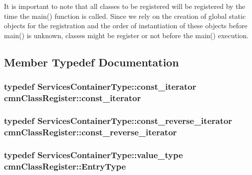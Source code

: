 It is important to note that all classes to be registered will be registered by the time the {\ttfamily main()} function is called. Since we rely on the creation of global static objects for the registration and the order of instantiation of these objects before {\ttfamily main()} is unknown, classes might be register or not before the {\ttfamily main()} execution. 

\subsection{Member Typedef Documentation}
\hypertarget{classcmn_class_register_aacfef62640c83b00064eba6c1f667e26}{
\subsubsection[{const\-\_\-iterator}]{\setlength{\rightskip}{0pt plus 5cm}typedef Services\-Container\-Type\-::const\-\_\-iterator {\bf cmn\-Class\-Register\-::const\-\_\-iterator}}}\label{classcmn_class_register_aacfef62640c83b00064eba6c1f667e26}
\hypertarget{classcmn_class_register_afdce6482c138fc3c4cb611f0ef7c7a08}{
\subsubsection[{const\-\_\-reverse\-\_\-iterator}]{\setlength{\rightskip}{0pt plus 5cm}typedef Services\-Container\-Type\-::const\-\_\-reverse\-\_\-iterator {\bf cmn\-Class\-Register\-::const\-\_\-reverse\-\_\-iterator}}}\label{classcmn_class_register_afdce6482c138fc3c4cb611f0ef7c7a08}
\hypertarget{classcmn_class_register_ac19a6e242b59d7f0336be30be97fabaf}{
\subsubsection[{Entry\-Type}]{\setlength{\rightskip}{0pt plus 5cm}typedef Services\-Container\-Type\-::value\-\_\-type {\bf cmn\-Class\-Register\-::\-Entry\-Type}}}\label{classcmn_class_register_ac19a6e242b59d7f0336be30be97fabaf}
